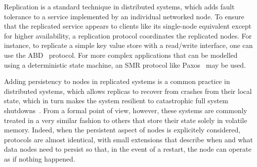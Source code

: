\label{chap:intro}
\cleardoublepage{}


Replication is a standard technique in distributed systems, which adds
fault tolerance to a service implemented by an individual networked
node. To ensure that the replicated service appears to clients like
its single-node equivalent except for higher availability, a
replication protocol coordinates the replicated
nodes. For instance, to replicate a simple key value store with a
read/write interface, one can use the \ac{ABD}~\cite{abd}
protocol. For more complex applications that can be modelled
using a deterministic state machine, an \ac{SMR} protocol like
Paxos~\cite{paxos} may be used.

Adding persistency to nodes in replicated systems is a common
practice in distributed systems, which allows replicas to recover
from crashes from their local state, which in turn makes the
system resilient to catastrophic full system
shutdowns~\cite{bolosky:paxos}. From a
formal point of view, however, these systems are commonly treated in a
very similar fashion to others that store their state solely in
volatile memory. Indeed, when the persistent aspect of nodes
is explicitely considered, protocols are almost identical, with
small extensions that describe when and what data nodes need to
persist so that, in the event of a restart, the node can
operate as if nothing happened.

